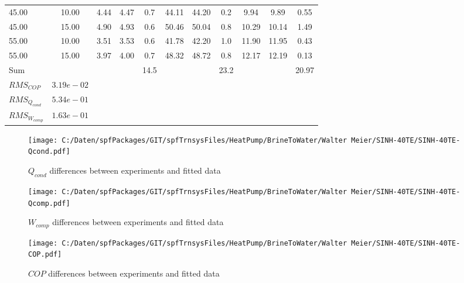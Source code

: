 \documentclass[english]{SPFShortReport}
\begin{document}
\begin{table}[!ht]
\begin{small}
\begin{center}
{\begin{tabular}{l | c c c c c c c c c c }
45.00  & 10.00 & 4.44 & 4.47 & 0.7 & 44.11 & 44.20 & 0.2 & 9.94 & 9.89 & 0.55\\ 
45.00  & 15.00 & 4.90 & 4.93 & 0.6 & 50.46 & 50.04 & 0.8 & 10.29 & 10.14 & 1.49\\ 
55.00  & 10.00 & 3.51 & 3.53 & 0.6 & 41.78 & 42.20 & 1.0 & 11.90 & 11.95 & 0.43\\ 
55.00  & 15.00 & 3.97 & 4.00 & 0.7 & 48.32 & 48.72 & 0.8 & 12.17 & 12.19 & 0.13\\ 
\hline 
 Sum &  & &  & 14.5 &  &  & 23.2 & &  & 20.97\\ 
\hline 
 $RMS_{COP}$ & $3.19e-02$ \\ 
 $RMS_{Q_{cond}}$ & $5.34e-01$ \\ 
 $RMS_{W_{comp}}$ & $1.63e-01$ \\ 
\hline
\hline
\end{tabular}
}
\label{ErrorsTable}
\end{center}
\end{small}
\end{table}
\begin{figure}[!ht]
\begin{center}
\texttt{[image: C:/Daten/spfPackages/GIT/spfTrnsysFiles/HeatPump/BrineToWater/Walter Meier/SINH-40TE/SINH-40TE-Qcond.pdf]}
\caption{$Q_{cond}$ differences between experiments and fitted data}
\label{QcongFig}
\end{center}
\end{figure}
\begin{figure}[!ht]
\begin{center}
\texttt{[image: C:/Daten/spfPackages/GIT/spfTrnsysFiles/HeatPump/BrineToWater/Walter Meier/SINH-40TE/SINH-40TE-Qcomp.pdf]}
\caption{$W_{comp}$ differences between experiments and fitted data}
\label{QcompFig}
\end{center}
\end{figure}
\begin{figure}[!ht]
\begin{center}
\texttt{[image: C:/Daten/spfPackages/GIT/spfTrnsysFiles/HeatPump/BrineToWater/Walter Meier/SINH-40TE/SINH-40TE-COP.pdf]}
\caption{$COP$ differences between experiments and fitted data}
\label{COPFig}
\end{center}
\end{figure}
\end{document}
